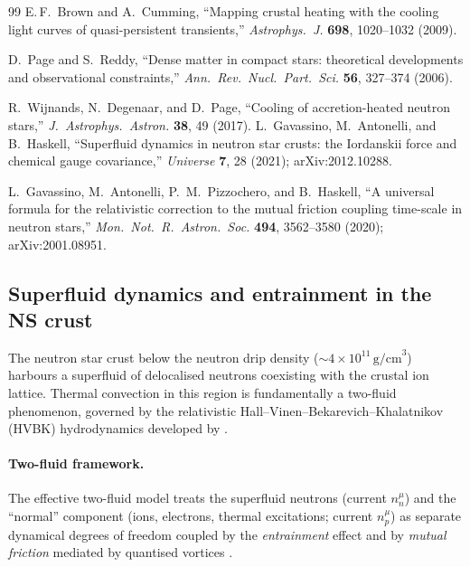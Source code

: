 \begin{thebibliography}{99}
E.\,F.~Brown and A.~Cumming,
``Mapping crustal heating with the cooling light curves of
quasi-persistent transients,''
\emph{Astrophys.\ J.} \textbf{698}, 1020--1032 (2009).

D.~Page and S.~Reddy,
``Dense matter in compact stars: theoretical developments
and observational constraints,''
\emph{Ann.\ Rev.\ Nucl.\ Part.\ Sci.} \textbf{56}, 327--374 (2006).

R.~Wijnands, N.~Degenaar, and D.~Page,
``Cooling of accretion-heated neutron stars,''
\emph{J.\ Astrophys.\ Astron.} \textbf{38}, 49 (2017).
L.~Gavassino, M.~Antonelli, and B.~Haskell,
``Superfluid dynamics in neutron star crusts: the Iordanskii force and
chemical gauge covariance,''
\emph{Universe} \textbf{7}, 28 (2021);
arXiv:2012.10288.

L.~Gavassino, M.~Antonelli, P.~M.~Pizzochero, and B.~Haskell,
``A universal formula for the relativistic correction to the mutual
friction coupling time-scale in neutron stars,''
\emph{Mon.\ Not.\ R.\ Astron.\ Soc.} \textbf{494}, 3562--3580 (2020);
arXiv:2001.08951.
\end{thebibliography}

\subsection{Superfluid dynamics and entrainment in the NS crust}
\label{sec:rel-60-superfluid}

The neutron star crust below the neutron drip density
($\sim 4\times 10^{11}\,\mathrm{g/cm}^{3}$) harbours a superfluid of
delocalised neutrons coexisting with the crustal ion lattice.  Thermal
convection in this region is fundamentally a two-fluid phenomenon,
governed by the relativistic Hall--Vinen--Bekarevich--Khalatnikov (HVBK)
hydrodynamics developed by \citet{GavassinoAntonelliHaskellSuperfluid2021}.

\paragraph{Two-fluid framework.}
The effective two-fluid model treats the superfluid neutrons (current
$n_{n}^{\mu}$) and the ``normal'' component (ions, electrons, thermal
excitations; current $n_{p}^{\mu}$) as separate dynamical degrees of
freedom coupled by the \emph{entrainment} effect and by
\emph{mutual friction} mediated by quantised vortices
\cite{GavassinoAntonelliHaskellSuperfluid2021}.

